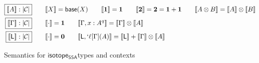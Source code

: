 \documentclass[acmsmall,screen,review]{acmart}
\newcommand{\mc}[1]{\ensuremath{\mathcal{#1}}}
\newcommand{\mb}[1]{\ensuremath{\mathbf{#1}}}
\newcommand{\ms}[1]{\ensuremath{\mathsf{#1}}}
\newcommand{\lbl}[1]{{`#1}}
\newcommand{\thyp}[3]{#1: {#2}^{#3}}
\newcommand{\lhyp}[3]{#1[#2](#3)}
\newcommand{\llhyp}[3]{\lhyp{\lbl{#1}}{#2}{#3}}
\newcommand{\dnt}[1]{\llbracket{#1}\rrbracket}
\newcommand{\isotopessa}{\ms{isotope_{SSA}}}
\begin{document}
\begin{figure}
  \begin{align*}
    \boxed{\dnt{A}: |\mc{C}|} & \qquad  
    \dnt{X} = \ms{base}(X) 
    \qquad
    \dnt{\mb{1}} = \mb{1}
    \qquad
    \dnt{\mb{2}} = \mb{2} = \mb{1} + \mb{1}
    \qquad \dnt{A \otimes B} = \dnt{A} \otimes \dnt{B} \\
    \boxed{\dnt{\Gamma}: |\mc{C}|} & \qquad 
    \dnt{\cdot} = \mb{1} \qquad 
    \dnt{\Gamma, \thyp{x}{A}{q}} = \dnt{\Gamma} \otimes \dnt{A} 
    \\
    \boxed{\dnt{\ms{L}}: |\mc{C}|} & \qquad 
    \dnt{\cdot} = \mb{0} \qquad
    \dnt{\ms{L}, \llhyp{\ell}{\Gamma}{A}} = 
      \dnt{\ms{L}} + \dnt{\Gamma} \otimes \dnt{A}
  \end{align*}
  \caption{Semantics for \isotopessa types and contexts}
  \label{fig:ssa-type-semantics}
\end{figure}
\end{document}
